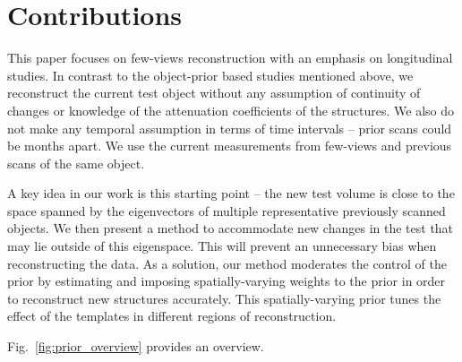 \documentclass[journal]{IEEEtran}
\begin{document}

\section{Contributions}
\label{sec:contributions}
This paper focuses on few-views reconstruction with an emphasis on
longitudinal studies. In contrast to the object-prior based studies
mentioned above, we reconstruct the current test object without any
assumption of continuity of changes or knowledge of the attenuation
coefficients of the structures. We also do not make any temporal
assumption in terms of time intervals -- prior scans could be months
apart. We use the current measurements from few-views and previous
scans of the same object.

A key idea in our work is this starting
point -- the new test volume is close to the space spanned by the
eigenvectors of multiple representative previously scanned objects.
We then present a method to accommodate new changes in the test that
may lie outside of this eigenspace. This will prevent an unnecessary
bias when reconstructing the data. As a solution, our method moderates
the control of the prior by estimating and imposing spatially-varying
weights to the prior in order to reconstruct new structures
accurately. This spatially-varying prior tunes the effect of the
templates in different regions of reconstruction.

Fig.~\ref{fig:prior_overview} provides an overview.

\end{document}
